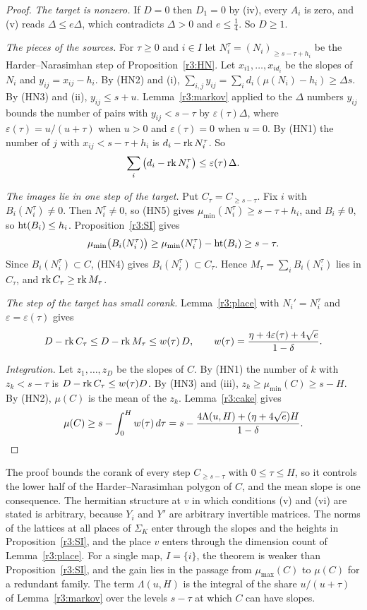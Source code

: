 \begin{proof}
\emph{The target is nonzero.} If $D=0$ then $D_1=0$ by (iv), every $A_i$ is zero, and (v) reads $\Delta\le e\Delta$, which contradicts $\Delta>0$ and $e\le\frac14$. So $D\ge1$.

\emph{The pieces of the sources.} For $\tau\ge0$ and $i\in I$ let $N_i^\tau=(N_i)_{\ge s-\tau+h_i}$ be the Harder--Narasimhan step of Proposition~\ref{r3:HN}. Let $x_{i1},\dots,x_{id_i}$ be the slopes of $N_i$ and $y_{ij}=x_{ij}-h_i$. By (HN2) and (i), $\sum_{i,j}y_{ij}=\sum_id_i(\mu(N_i)-h_i)\ge \Delta s$. By (HN3) and (ii), $y_{ij}\le s+u$. Lemma~\ref{r3:markov} applied to the $\Delta$ numbers $y_{ij}$ bounds the number of pairs with $y_{ij}<s-\tau$ by $\varepsilon(\tau)\Delta$, where $\varepsilon(\tau)=u/(u+\tau)$ when $u>0$ and $\varepsilon(\tau)=0$ when $u=0$. By (HN1) the number of $j$ with $x_{ij}<s-\tau+h_i$ is $d_i-\operatorname{rk} N_i^\tau$. So
\[
\sum_i\big(d_i-\operatorname{rk} N_i^\tau\big)\le\varepsilon(\tau)\,\Delta .
\]

\emph{The images lie in one step of the target.} Put $C_\tau=C_{\ge s-\tau}$. Fix $i$ with $B_i(N_i^\tau)\ne0$. Then $N_i^\tau\ne0$, so (HN5) gives $\mu_{\min}(N_i^\tau)\ge s-\tau+h_i$, and $B_i\ne0$, so $\operatorname{ht}(B_i)\le h_i$. Proposition~\ref{r3:SI} gives
\[
\mu_{\min}\big(B_i(N_i^\tau)\big)\ge\mu_{\min}(N_i^\tau)-\operatorname{ht}(B_i)\ge s-\tau .
\]
Since $B_i(N_i^\tau)\subset C$, (HN4) gives $B_i(N_i^\tau)\subset C_\tau$. Hence $M_\tau=\sum_iB_i(N_i^\tau)$ lies in $C_\tau$, and $\operatorname{rk} C_\tau\ge\operatorname{rk} M_\tau$.

\emph{The step of the target has small corank.} Lemma~\ref{r3:place} with $N_i'=N_i^\tau$ and $\varepsilon=\varepsilon(\tau)$ gives
\[
D-\operatorname{rk} C_\tau\le D-\operatorname{rk} M_\tau\le w(\tau)\,D,\qquad w(\tau)=\frac{\eta+4\varepsilon(\tau)+4\sqrt e}{1-\delta}.
\]

\emph{Integration.} Let $z_1,\dots,z_D$ be the slopes of $C$. By (HN1) the number of $k$ with $z_k<s-\tau$ is $D-\operatorname{rk} C_\tau\le w(\tau)D$. By (HN3) and (iii), $z_k\ge\mu_{\min}(C)\ge s-H$. By (HN2), $\mu(C)$ is the mean of the $z_k$. Lemma~\ref{r3:cake} gives
\[
\mu(C)\ge s-\int_0^Hw(\tau)\,d\tau=s-\frac{4\Lambda(u,H)+(\eta+4\sqrt e)H}{1-\delta}.\qedhere
\]
\end{proof}

\begin{remark}\label{r3:rem:frame}
The proof bounds the corank of every step $C_{\ge s-\tau}$ with $0\le\tau\le H$, so it controls the lower half of the Harder--Narasimhan polygon of $C$, and the mean slope is one consequence. The hermitian structure at $v$ in which conditions (v) and (vi) are stated is arbitrary, because $Y_i$ and $Y'$ are arbitrary invertible matrices. The norms of the lattices at all places of $\Sigma_K$ enter through the slopes and the heights in Proposition~\ref{r3:SI}, and the place $v$ enters through the dimension count of Lemma~\ref{r3:place}. For a single map, $I=\{i\}$, the theorem is weaker than Proposition~\ref{r3:SI}, and the gain lies in the passage from $\mu_{\max}(C)$ to $\mu(C)$ for a redundant family. The term $\Lambda(u,H)$ is the integral of the share $u/(u+\tau)$ of Lemma~\ref{r3:markov} over the levels $s-\tau$ at which $C$ can have slopes.
\end{remark}

